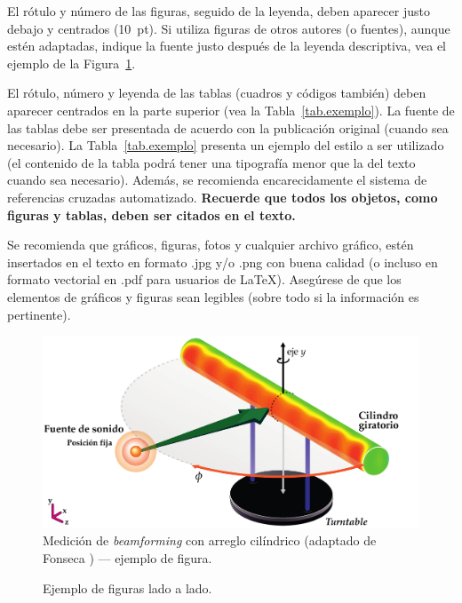 El rótulo y número de las figuras, seguido de la leyenda, deben aparecer justo debajo y centrados (10~pt). Si utiliza figuras de otros autores (o fuentes), aunque estén adaptadas, indique la fuente justo después de la leyenda descriptiva, vea el ejemplo de la Figura~\ref{fig:beamforming}.

El rótulo, número y leyenda de las tablas (cuadros y códigos también) deben aparecer centrados en la parte superior (vea la Tabla~\ref{tab.exemplo}). La fuente de las tablas debe ser presentada de acuerdo con la publicación original (cuando sea necesario). La Tabla~\ref{tab.exemplo} presenta un ejemplo del estilo a ser utilizado (el contenido de la tabla podrá tener una tipografía menor que la del texto cuando sea necesario). Además, se recomienda encarecidamente el sistema de referencias cruzadas automatizado. \textbf{Recuerde que todos los objetos, como figuras y tablas, deben ser citados en el texto.}

Se recomienda que gráficos, figuras, fotos y cualquier archivo gráfico, estén insertados en el texto en formato .jpg y/o .png con buena calidad (o incluso en formato vectorial en .pdf para usuarios de \LaTeX\xspace). Asegúrese de que los elementos de gráficos y figuras sean legibles (sobre todo si la información es pertinente).

\begin{figure}[!ht] %
	\centering
	\includegraphics[width=0.72\linewidth]{figs/Measurement-Scheme-Fonseca-2013-sp.pdf}%
	\caption{Medición de \textit{beamforming} con arreglo cilíndrico (adaptado de Fonseca \cite{Fonseca-2013}) --- ejemplo de figura.}
	\label{fig:beamforming}%
\end{figure}


\begin{figure}[!ht]
  \centering
	\quad
  \caption{Ejemplo de figuras lado a lado.}
  \label{subfig.exemplo}
\end{figure}


